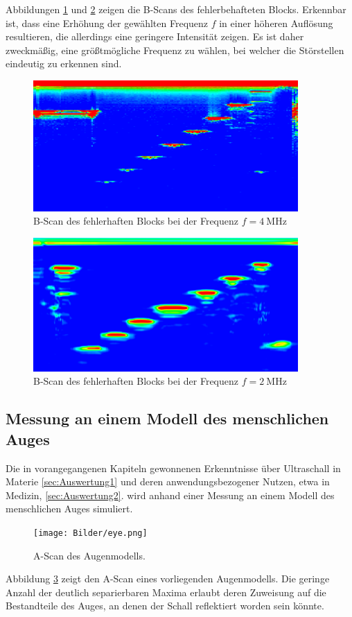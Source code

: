 Abbildungen \ref{fig:b_scan_4} und \ref{fig:b_scan_2} zeigen die B-Scans des fehlerbehafteten Blocks.
Erkennbar ist, dass eine Erhöhung der gewählten Frequenz $f$ in einer höheren Auflösung resultieren, die allerdings eine geringere Intensität zeigen.
Es ist daher zweckmäßig, eine größtmögliche Frequenz zu wählen, bei welcher die Störstellen eindeutig zu erkennen sind.
\begin{figure}[p]
	\centering
	\includegraphics[width=0.9\textwidth]{Bilder/Block_4Mhz.png}
	\caption{B-Scan des fehlerhaften Blocks bei der Frequenz $f=\SI{4}{\mega\hertz}$}
	\label{fig:b_scan_4}
\end{figure}
\begin{figure}[p]
	\centering
	\includegraphics[width=0.9\textwidth]{Bilder/Bscan_2.png}
	\caption{B-Scan des fehlerhaften Blocks bei der Frequenz $f=\SI{2}{\mega\hertz}$}
	\label{fig:b_scan_2}
\end{figure}

\subsection{Messung an einem Modell des menschlichen Auges}
Die in vorangegangenen Kapiteln gewonnenen Erkenntnisse über Ultraschall in Materie \ref{sec:Auswertung1} und deren anwendungsbezogener Nutzen, etwa in Medizin, \ref{sec:Auswertung2}. wird anhand einer  Messung an einem Modell des menschlichen Auges simuliert.
\begin{figure}[h]
	\centering
	\texttt{[image: Bilder/eye.png]}
	\caption{A-Scan des Augenmodells.}
	\label{fig:eye_scan}
\end{figure}
Abbildung \ref{fig:eye_scan} zeigt den A-Scan eines vorliegenden Augenmodells.
Die geringe Anzahl der deutlich separierbaren Maxima erlaubt deren Zuweisung auf die Bestandteile des Auges, an denen der Schall reflektiert worden sein könnte. 